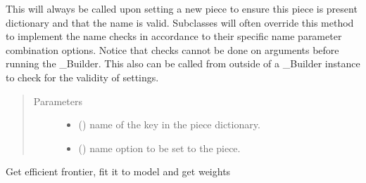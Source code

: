\documentclass[letterpaper,10pt,english]{sphinxmanual}
\begin{document}
\begin{fulllineitems}
\begin{fulllineitems}
This will always be called upon setting a new piece to ensure this
piece is present dictionary and that the name is valid. Subclasses
will often override this method to implement the name checks in
accordance to their specific name parameter combination options.
Notice that checks cannot be done on arguments before running the
\_Builder. This also can be called from outside of a \_Builder instance
to check for the validity of settings.
\begin{quote}\begin{description}
\item[{Parameters}] \leavevmode\begin{itemize}
\item {} 
 () \textendash{} name of the key in the piece dictionary.

\item {} 
 () \textendash{} name option to be set to the piece.

\end{itemize}

\end{description}\end{quote}

\end{fulllineitems}


\begin{fulllineitems}
\label{\detokenize{dalio.model:dalio.model.financial.OptimumWeights.gamma}}
\end{fulllineitems}


\begin{fulllineitems}
\label{\detokenize{dalio.model:dalio.model.financial.OptimumWeights.run}}
Get efficient frontier, fit it to model and get weights

\end{fulllineitems}


\begin{fulllineitems}
\label{\detokenize{dalio.model:dalio.model.financial.OptimumWeights.weight_bounds}}
\end{fulllineitems}


\end{fulllineitems}
\end{document}
